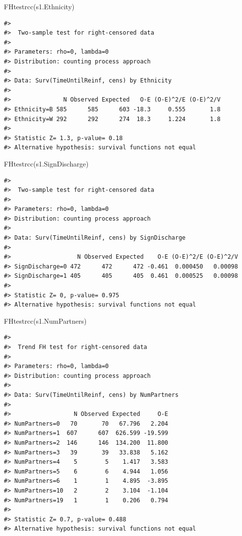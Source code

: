 \documentclass[
]{article}
\newenvironment{Shaded}{\begin{snugshade}}{\end{snugshade}}
\newcommand{\FunctionTok}[1]{\textcolor[rgb]{0.00,0.00,0.00}{#1}}
\newcommand{\NormalTok}[1]{#1}
\begin{document}
\begin{Shaded}
\begin{Highlighting}[]
\FunctionTok{FHtestrcc}\NormalTok{(s1.Ethnicity)}
\end{Highlighting}
\end{Shaded}

\begin{verbatim}
#> 
#>  Two-sample test for right-censored data
#> 
#> Parameters: rho=0, lambda=0
#> Distribution: counting process approach
#> 
#> Data: Surv(TimeUntilReinf, cens) by Ethnicity
#> 
#>               N Observed Expected   O-E (O-E)^2/E (O-E)^2/V
#> Ethnicity=B 585      585      603 -18.3     0.555       1.8
#> Ethnicity=W 292      292      274  18.3     1.224       1.8
#> 
#> Statistic Z= 1.3, p-value= 0.18
#> Alternative hypothesis: survival functions not equal
\end{verbatim}

\begin{Shaded}
\begin{Highlighting}[]
\FunctionTok{FHtestrcc}\NormalTok{(s1.SignDischarge)}
\end{Highlighting}
\end{Shaded}

\begin{verbatim}
#> 
#>  Two-sample test for right-censored data
#> 
#> Parameters: rho=0, lambda=0
#> Distribution: counting process approach
#> 
#> Data: Surv(TimeUntilReinf, cens) by SignDischarge
#> 
#>                   N Observed Expected    O-E (O-E)^2/E (O-E)^2/V
#> SignDischarge=0 472      472      472 -0.461  0.000450   0.00098
#> SignDischarge=1 405      405      405  0.461  0.000525   0.00098
#> 
#> Statistic Z= 0, p-value= 0.975
#> Alternative hypothesis: survival functions not equal
\end{verbatim}

\begin{Shaded}
\begin{Highlighting}[]
\FunctionTok{FHtestrcc}\NormalTok{(s1.NumPartners)}
\end{Highlighting}
\end{Shaded}

\begin{verbatim}
#> 
#>  Trend FH test for right-censored data
#> 
#> Parameters: rho=0, lambda=0
#> Distribution: counting process approach
#> 
#> Data: Surv(TimeUntilReinf, cens) by NumPartners
#> 
#>                  N Observed Expected     O-E
#> NumPartners=0   70       70   67.796   2.204
#> NumPartners=1  607      607  626.599 -19.599
#> NumPartners=2  146      146  134.200  11.800
#> NumPartners=3   39       39   33.838   5.162
#> NumPartners=4    5        5    1.417   3.583
#> NumPartners=5    6        6    4.944   1.056
#> NumPartners=6    1        1    4.895  -3.895
#> NumPartners=10   2        2    3.104  -1.104
#> NumPartners=19   1        1    0.206   0.794
#> 
#> Statistic Z= 0.7, p-value= 0.488
#> Alternative hypothesis: survival functions not equal
\end{verbatim}
\end{document}
